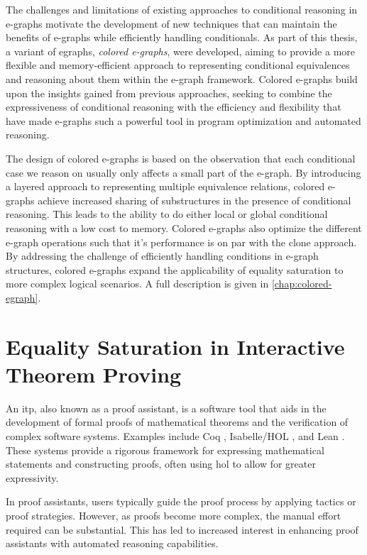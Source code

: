 The challenges and limitations of existing approaches to conditional reasoning in e-graphs motivate the development of new techniques that can maintain the benefits of e-graphs while efficiently handling conditionals. 
As part of this thesis, a variant of \gls{egraphs}, \emph{colored e-graphs}, were developed, aiming to provide a more flexible and memory-efficient approach to representing conditional equivalences and reasoning about them within the e-graph framework.
Colored e-graphs build upon the insights gained from previous approaches, seeking to combine the expressiveness of conditional reasoning with the efficiency and flexibility that have made e-graphs such a powerful tool in program optimization and automated reasoning. 

The design of colored e-graphs is based on the observation that each conditional case we reason on usually only affects a small part of the e-graph.
By introducing a layered approach to representing multiple equivalence relations, colored e-graphs achieve increased sharing of substructures in the presence of conditional reasoning.
This leads to the ability to do either local or global conditional reasoning with a low cost to memory.
Colored e-graphs also optimize the different e-graph operations such that it's performance is on par with the clone approach.
By addressing the challenge of efficiently handling conditions in e-graph structures, colored e-graphs expand the applicability of equality saturation to more complex logical scenarios.
A full description is given in \autoref{chap:colored-egraph}.


\section{Equality Saturation in Interactive Theorem Proving}

An \gls{itp}, also known as a proof assistant, is a software tool that aids in the development of formal proofs of mathematical theorems and the verification of complex software systems.
Examples include Coq \cite{Coq:manual}, Isabelle/HOL \cite{Book2002:Nipkow}, and Lean \cite{lean}. 
These systems provide a rigorous framework for expressing mathematical statements and constructing proofs, often using \gls{hol} to allow for greater expressivity.

In proof assistants, users typically guide the proof process by applying tactics or proof strategies. 
However, as proofs become more complex, the manual effort required can be substantial. 
This has led to increased interest in enhancing proof assistants with automated reasoning capabilities.

